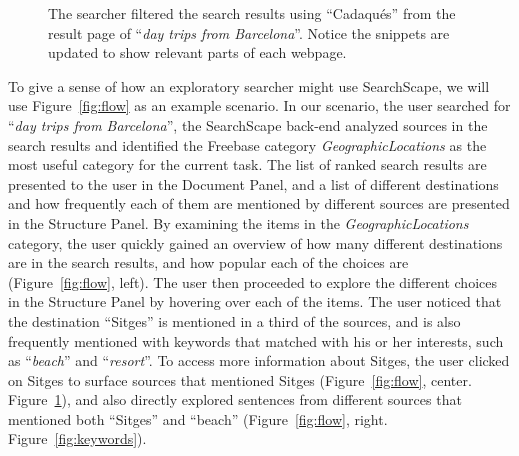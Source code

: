 \begin{figure}
    \centering
    \caption[Filtering the search results using ``Cadaqu\'es'' from the result page.]{The searcher filtered the search results using ``Cadaqu\'es'' from the result page of ``\emph{day trips from Barcelona}''. Notice the snippets are updated to show relevant parts of each webpage.}
    \label{fig:filter}
\end{figure}


To give a sense of how an exploratory searcher might use SearchScape, we will use Figure~\ref{fig:flow} as an example scenario. In our scenario, the user searched for ``\emph{day trips from Barcelona}'', the SearchScape back-end analyzed sources in the search results and identified the Freebase category \emph{GeographicLocations} as the most useful category for the current task. The list of ranked search results are presented to the user in the Document Panel, and a list of different destinations and how frequently each of them are mentioned by different sources are presented in the Structure Panel. By examining the items in the \emph{GeographicLocations} category, the user quickly gained an overview of how many different destinations are in the search results, and how popular each of the choices are (Figure~\ref{fig:flow}, left). The user then proceeded to explore the different choices in the Structure Panel by hovering over each of the items. The user noticed that the destination ``Sitges'' is mentioned in a third of the sources, and is also frequently mentioned with keywords that matched with his or her interests, such as ``\emph{beach}'' and ``\emph{resort}''. To access more information about Sitges, the user clicked on Sitges to surface sources that mentioned Sitges (Figure~\ref{fig:flow}, center. Figure~\ref{fig:filter}), and also directly explored sentences from different sources that mentioned both ``Sitges'' and ``beach'' (Figure~\ref{fig:flow}, right. Figure~\ref{fig:keywords}).


